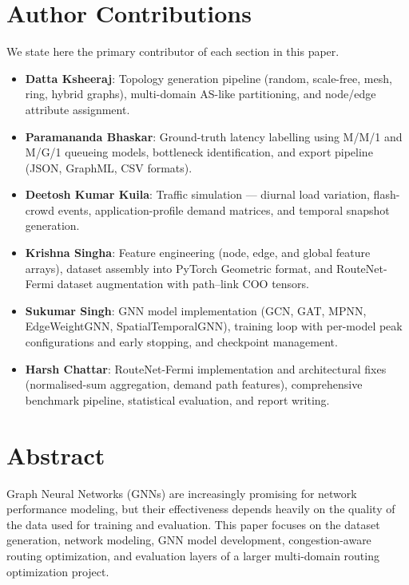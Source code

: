 \documentclass[12pt]{article}
\begin{document}
\section*{Author Contributions}
We state here the primary contributor of each section in this paper. 
\begin{itemize}
    \item \textbf{Datta Ksheeraj}: Topology generation pipeline (random, scale-free, mesh, ring, hybrid graphs), multi-domain AS-like partitioning, and node/edge attribute assignment.
    \item \textbf{Paramananda Bhaskar}: Ground-truth latency labelling using M/M/1 and M/G/1 queueing models, bottleneck identification, and export pipeline (JSON, GraphML, CSV formats).
    \item \textbf{Deetosh Kumar Kuila}: Traffic simulation --- diurnal load variation, flash-crowd events, application-profile demand matrices, and temporal snapshot generation.
    \item \textbf{Krishna Singha}: Feature engineering (node, edge, and global feature arrays), dataset assembly into PyTorch Geometric format, and RouteNet-Fermi dataset augmentation with path--link COO tensors.
    \item \textbf{Sukumar Singh}: GNN model implementation (GCN, GAT, MPNN, EdgeWeightGNN, SpatialTemporalGNN), training loop with per-model peak configurations and early stopping, and checkpoint management.
    \item \textbf{Harsh Chattar}: RouteNet-Fermi implementation and architectural fixes (normalised-sum aggregation, demand path features), comprehensive benchmark pipeline, statistical evaluation, and report writing.
\end{itemize}

\thispagestyle{empty}
\newpage

\thispagestyle{empty}
\newpage

\tableofcontents
\newpage

\section{Abstract}
Graph Neural Networks (GNNs) are increasingly promising for network performance modeling, but their effectiveness depends heavily on the quality of the data used for training and evaluation. This paper focuses on the dataset generation, network modeling, GNN model development, congestion-aware routing optimization, and evaluation layers of a larger multi-domain routing optimization project. 
\end{document}
